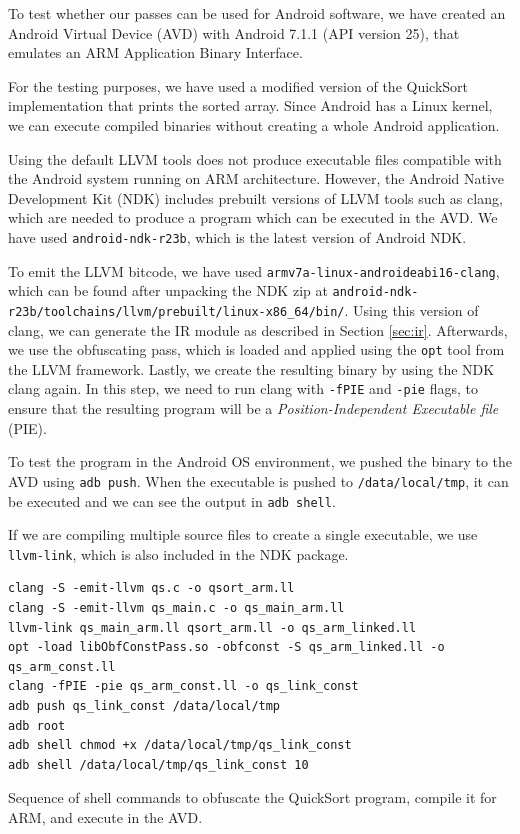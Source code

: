 \documentclass[
  digital, %
  notable,   %
  twoside, %
  nolof,     %
  nolot,     %
]{fithesis3}
\theoremstyle{definition}
\begin{document}
To test whether our passes can be used for Android software, we have created an Android Virtual Device (AVD) with Android 7.1.1 (API version 25), that emulates an ARM Application Binary Interface. 

For the testing purposes, we have used a modified version of the QuickSort implementation that prints the sorted array. Since Android has a Linux kernel, we can execute compiled binaries without creating a whole Android application. 

Using the default LLVM tools does not produce executable files compatible with the Android system running on ARM architecture. However, the Android Native Development Kit (NDK) includes prebuilt versions of LLVM tools such as clang, which are needed to produce a program which can be executed in the AVD. We have used \texttt{android-ndk-r23b}, which is the latest version of Android NDK.

To emit the LLVM bitcode, we have used \texttt{armv7a-linux-androideabi16-clang}, which can be found after unpacking the NDK zip at \texttt{android-ndk-r23b/toolchains/llvm/prebuilt/linux-x86\_64/bin/}. Using this version of clang, we can generate the IR module as described in Section \ref{sec:ir}. Afterwards, we use the obfuscating pass, which is loaded and applied using the \texttt{opt} tool from the LLVM framework. Lastly, we create the resulting binary by using the NDK clang again. In this step, we need to run clang with \texttt{-fPIE} and \texttt{-pie} flags, to ensure that the resulting program will be a \textit{Position-Independent Executable file} (PIE).

To test the program in the Android OS environment, we pushed the binary to the AVD using \texttt{adb push}. When the executable is pushed to \texttt{/data/local/tmp}, it can be executed and we can see the output in \texttt{adb shell}. 

If we are compiling multiple source files to create a single executable, we use \texttt{llvm-link}, which is also included in the NDK package. 

\begin{listing}
\begin{verbatim}
clang -S -emit-llvm qs.c -o qsort_arm.ll
clang -S -emit-llvm qs_main.c -o qs_main_arm.ll
llvm-link qs_main_arm.ll qsort_arm.ll -o qs_arm_linked.ll
opt -load libObfConstPass.so -obfconst -S qs_arm_linked.ll -o qs_arm_const.ll
clang -fPIE -pie qs_arm_const.ll -o qs_link_const
adb push qs_link_const /data/local/tmp
adb root
adb shell chmod +x /data/local/tmp/qs_link_const
adb shell /data/local/tmp/qs_link_const 10
\end{verbatim}
\label{lst:arm}
\caption{Sequence of shell commands to obfuscate the QuickSort program, compile it for ARM, and execute in the AVD.}
\end{listing}
\end{document}
